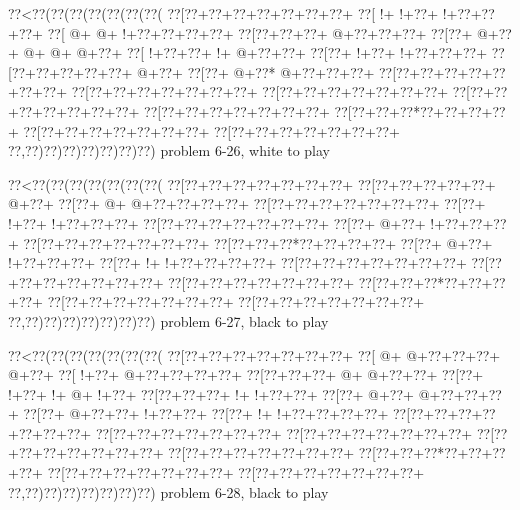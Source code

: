 \vbox{\vbox{\goo
\0??<\0??(\0??(\0??(\0??(\0??(\0??(\0??(
\0??[\0??+\0??+\0??+\0??+\0??+\0??+\0??+
\0??[\- !+\- !+\0??+\- !+\0??+\0??+\0??+
\0??[\- @+\- @+\- !+\0??+\0??+\0??+\0??+
\0??[\0??+\0??+\0??+\- @+\0??+\0??+\0??+
\0??[\0??+\- @+\0??+\- @+\- @+\- @+\0??+
\0??[\- !+\0??+\0??+\- !+\- @+\0??+\0??+
\0??[\0??+\- !+\0??+\- !+\0??+\0??+\0??+
\0??[\0??+\0??+\0??+\0??+\0??+\- @+\0??+
\0??[\0??+\- @+\0??*\- @+\0??+\0??+\0??+
\0??[\0??+\0??+\0??+\0??+\0??+\0??+\0??+
\0??[\0??+\0??+\0??+\0??+\0??+\0??+\0??+
\0??[\0??+\0??+\0??+\0??+\0??+\0??+\0??+
\0??[\0??+\0??+\0??+\0??+\0??+\0??+\0??+
\0??[\0??+\0??+\0??+\0??+\0??+\0??+\0??+
\0??[\0??+\0??+\0??*\0??+\0??+\0??+\0??+
\0??[\0??+\0??+\0??+\0??+\0??+\0??+\0??+
\0??[\0??+\0??+\0??+\0??+\0??+\0??+\0??+
\0??,\0??)\0??)\0??)\0??)\0??)\0??)\0??)
}
\hfil problem 6-26, white to play\hfil\break
}

\vbox{\vbox{\goo
\0??<\0??(\0??(\0??(\0??(\0??(\0??(\0??(
\0??[\0??+\0??+\0??+\0??+\0??+\0??+\0??+
\0??[\0??+\0??+\0??+\0??+\0??+\- @+\0??+
\0??[\0??+\- @+\- @+\0??+\0??+\0??+\0??+
\0??[\0??+\0??+\0??+\0??+\0??+\0??+\0??+
\0??[\0??+\- !+\0??+\- !+\0??+\0??+\0??+
\0??[\0??+\0??+\0??+\0??+\0??+\0??+\0??+
\0??[\0??+\- @+\0??+\- !+\0??+\0??+\0??+
\0??[\0??+\0??+\0??+\0??+\0??+\0??+\0??+
\0??[\0??+\0??+\0??*\0??+\0??+\0??+\0??+
\0??[\0??+\- @+\0??+\- !+\0??+\0??+\0??+
\0??[\0??+\- !+\- !+\0??+\0??+\0??+\0??+
\0??[\0??+\0??+\0??+\0??+\0??+\0??+\0??+
\0??[\0??+\0??+\0??+\0??+\0??+\0??+\0??+
\0??[\0??+\0??+\0??+\0??+\0??+\0??+\0??+
\0??[\0??+\0??+\0??*\0??+\0??+\0??+\0??+
\0??[\0??+\0??+\0??+\0??+\0??+\0??+\0??+
\0??[\0??+\0??+\0??+\0??+\0??+\0??+\0??+
\0??,\0??)\0??)\0??)\0??)\0??)\0??)\0??)
}
\hfil problem 6-27, black to play\hfil\break
}

\vbox{\vbox{\goo
\0??<\0??(\0??(\0??(\0??(\0??(\0??(\0??(
\0??[\0??+\0??+\0??+\0??+\0??+\0??+\0??+
\0??[\- @+\- @+\0??+\0??+\0??+\- @+\0??+
\0??[\- !+\0??+\- @+\0??+\0??+\0??+\0??+
\0??[\0??+\0??+\0??+\- @+\- @+\0??+\0??+
\0??[\0??+\- !+\0??+\- !+\- @+\- !+\0??+
\0??[\0??+\0??+\0??+\- !+\- !+\0??+\0??+
\0??[\0??+\- @+\0??+\- @+\0??+\0??+\0??+
\0??[\0??+\- @+\0??+\0??+\- !+\0??+\0??+
\0??[\0??+\- !+\- !+\0??+\0??+\0??+\0??+
\0??[\0??+\0??+\0??+\0??+\0??+\0??+\0??+
\0??[\0??+\0??+\0??+\0??+\0??+\0??+\0??+
\0??[\0??+\0??+\0??+\0??+\0??+\0??+\0??+
\0??[\0??+\0??+\0??+\0??+\0??+\0??+\0??+
\0??[\0??+\0??+\0??+\0??+\0??+\0??+\0??+
\0??[\0??+\0??+\0??*\0??+\0??+\0??+\0??+
\0??[\0??+\0??+\0??+\0??+\0??+\0??+\0??+
\0??[\0??+\0??+\0??+\0??+\0??+\0??+\0??+
\0??,\0??)\0??)\0??)\0??)\0??)\0??)\0??)
}
\hfil problem 6-28, black to play\hfil\break
}

